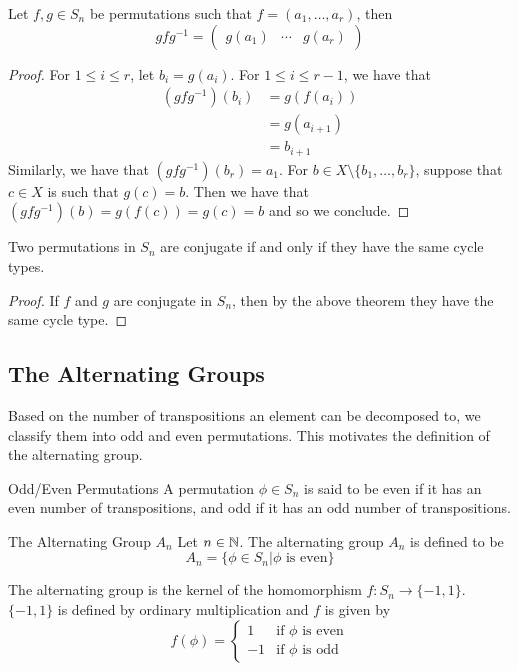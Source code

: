 \documentclass[a4paper]{article}
\begin{document}
\begin{prp}{}{} Let $f,g\in S_n$ be permutations such that $f=(a_1,\dots,a_r)$, then $$gfg^{-1}=\begin{pmatrix}g(a_1) & \cdots & g(a_r)\end{pmatrix}$$ 
\begin{proof}
For $1\leq i\leq r$, let $b_i=g(a_i)$. For $1\leq i\leq r-1$, we have that 
\begin{align*}
(gfg^{-1})(b_i)&=g(f(a_i))\\
&=g(a_{i+1})\\
&=b_{i+1}
\end{align*}
Similarly, we have that $(gfg^{-1})(b_r)=a_1$. For $b\in X\setminus\{b_1,\dots,b_r\}$, suppose that $c\in X$ is such that $g(c)=b$. Then we have that $(gfg^{-1})(b)=g(f(c))=g(c)=b$ and so we conclude. 
\end{proof}
\end{prp}

\begin{prp}{}{} Two permutations in $S_n$ are conjugate if and only if they have the same cycle types. 
\begin{proof}
If $f$ and $g$ are conjugate in $S_n$, then by the above theorem they have the same cycle type. 
\end{proof}
\end{prp}

\subsection{The Alternating Groups}
Based on the number of transpositions an element can be decomposed to, we classify them into odd and even permutations. This motivates the definition of the alternating group. 

\begin{defn}{Odd/Even Permutations}{} A permutation $\phi\in S_n$ is said to be even if it has an even number of transpositions, and odd if it has an odd number of transpositions. 
\end{defn}

\begin{defn}{The Alternating Group $A_n$}{} Let $n\in\mathbb{N}$. The alternating group $A_n$ is defined to be $$A_n=\{\phi\in S_n|\phi\text{ is even}\}$$
\end{defn}

\begin{thm}{}{} The alternating group is the kernel of the homomorphism $f:S_n\to\{-1,1\}$. $\{-1,1\}$ is defined by ordinary multiplication and $f$ is given by $$f(\phi)=\begin{cases}
1 & \text{if $\phi$ is even}\\
-1 & \text{if $\phi$ is odd}
\end{cases}$$
\end{thm}
\end{document}
